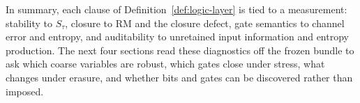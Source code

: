 In summary, each clause of Definition~\ref{def:logic-layer} is tied to a measurement: stability to \(S_\tau\), closure to RM and the closure defect, gate semantics to channel error and entropy, and auditability to unretained input information and entropy production. The next four sections read these diagnostics off the frozen bundle to ask which coarse variables are robust, which gates close under stress, what changes under erasure, and whether bits and gates can be discovered rather than imposed.
